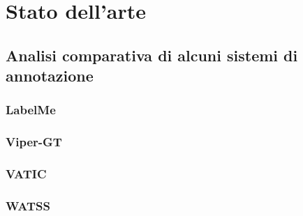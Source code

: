 \chapter{Stato dell'arte}
\label{ch:panoramica}

\section{Analisi comparativa di alcuni sistemi di annotazione}

\subsection{LabelMe}

\subsection{Viper-GT}

\subsection{VATIC}

\subsection{WATSS}
